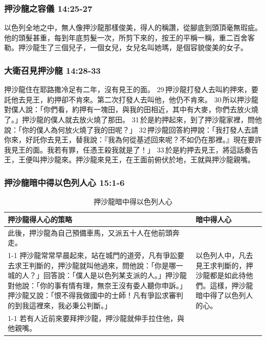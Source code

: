 \subsubsection{押沙龍之容儀 14:25-27}
以色列全地之中，無人像押沙龍那樣俊美，得人的稱讚，從腳底到頭頂毫無瑕疵。他的頭髮甚重，每到年底剪髮一次，所剪下來的，按王的平稱一稱，重二百舍客勒。押沙龍生了三個兒子，一個女兒，女兒名叫她瑪，是個容貌俊美的女子。

\subsubsection{大衛召見押沙龍 14:28-33}
押沙龍住在耶路撒冷足有二年，沒有見王的面。 29 押沙龍打發人去叫約押來，要託他去見王，約押卻不肯來。第二次打發人去叫他，他仍不肯來。 30 所以押沙龍對僕人說：「你們看，約押有一塊田，與我的田相近，其中有大麥，你們去放火燒了。」押沙龍的僕人就去放火燒了那田。 31 於是約押起來，到了押沙龍家裡，問他說：「你的僕人為何放火燒了我的田呢？」 32 押沙龍回答約押說：「我打發人去請你來，好託你去見王，替我說：『我為何從基述回來呢？不如仍在那裡。』現在要許我見王的面。我若有罪，任憑王殺我就是了！」 33 於是約押去見王，將這話奏告王，王便叫押沙龍來。押沙龍來見王，在王面前俯伏於地，王就與押沙龍親嘴。

\subsubsection{押沙龍暗中得以色列人心 15:1-6}
\begin{table}[H]
\hspace*{-5mm}
\centering 
\begin{tabular}{p{15.5cm}|p{2.75cm}}\hline\hline
押沙龍得人心的策略&暗中得人心\\\hline
此後，押沙龍為自己預備車馬，又派五十人在他前頭奔走。&\multirow{3}{2.85cm}{以色列人中，凡去見王求判斷的，押沙龍都是如此待他們。這樣，押沙龍暗中得了以色列人的心。}\\\cline{1-1}
押沙龍常常早晨起來，站在城門的道旁，凡有爭訟要去求王判斷的，押沙龍就叫他過來，問他說：「你是哪一城的人？」回答說：「僕人是以色列某支派的人。」押沙龍對他說：「你的事有情有理，無奈王沒有委人聽你申訴。」押沙龍又說：「恨不得我做國中的士師！凡有爭訟求審判的到我這裡來，我必秉公判斷。」&\\\cline{1-1}
若有人近前來要拜押沙龍，押沙龍就伸手拉住他，與他親嘴。&\\\hline
\end{tabular}
\caption{押沙龍暗中得以色列人心}
\end{table}


